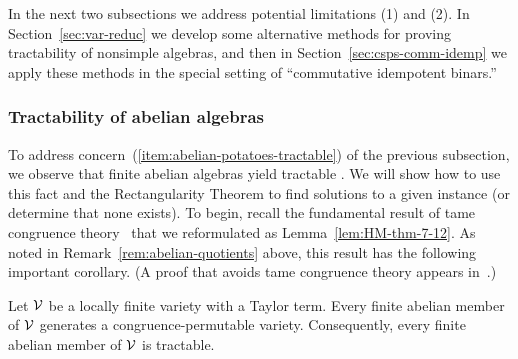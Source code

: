 In the next two subsections we address potential limitations (1) and (2).
In Section~\ref{sec:var-reduc} we develop some alternative methods for
proving tractability of nonsimple algebras, and then
in Section~\ref{sec:csps-comm-idemp} we apply these methods 
in the special setting of ``commutative idempotent binars.''

\subsubsection{Tractability of abelian algebras}
\label{sec:tract-abel-algebr}
To address concern~(\ref{item:abelian-potatoes-tractable})
of the previous subsection, we observe that finite abelian algebras yield
tractable \csps.
We will show how to use this fact and the Rectangularity Theorem to find 
solutions to a given \csp instance (or determine that none exists).
%
%
To begin, recall the fundamental result of tame congruence
theory~\cite[Thm~7.12]{HM:1988}  that we 
reformulated as Lemma~\ref{lem:HM-thm-7-12}.
As noted in Remark~\ref{rem:abelian-quotients} above,
this result has the following important corollary.
(A proof that avoids tame congruence theory appears in~\cite[Thm~5.1]{MR3374664}.)
\begin{theorem}
  \label{thm:type2cp}
Let $\mathcal{V}$ be a locally finite variety with a Taylor term. Every finite abelian member of $\mathcal{V}$ generates a congruence-permutable variety. Consequently, every finite abelian member of $\mathcal{V}$ is tractable.
\end{theorem}

